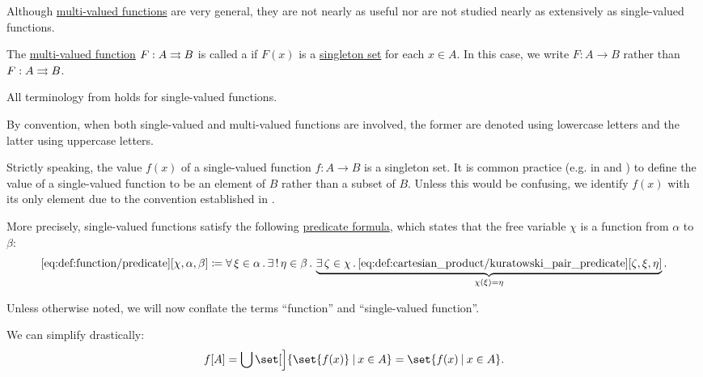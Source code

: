 \begin{definition}\label{def:function}
  Although \hyperref[def:multi_valued_function]{multi-valued functions} are very general, they are not nearly as useful nor are not studied nearly as extensively as single-valued functions.

  The \hyperref[def:multi_valued_function]{multi-valued function} \( F: A \rightrightarrows B \) is called a  if \( F(x) \) is a \hyperref[rem:singleton_sets]{singleton set} for each \( x \in A \). In this case, we write \( F: A \to B \) rather than \( F: A \rightrightarrows B \).

  All terminology from  holds for single-valued functions.

  By convention, when both single-valued and multi-valued functions are involved, the former are denoted using lowercase letters and the latter using uppercase letters.

  Strictly speaking, the value \( f(x) \) of a single-valued function \( f: A \to B \) is a singleton set. It is common practice (e.g. in \cite[def. 3.1]{OpenLogicFull} and \cite[10]{Kelley1955}) to define the value of a single-valued function to be an element of \( B \) rather than a subset of \( B \). Unless this would be confusing, we identify \( f(x) \) with its only element due to the convention established in .

  More precisely, single-valued functions satisfy the following \hyperref[rem:predicate_formula]{predicate formula}, which states that the free variable \( \chi \) is a function from \( \alpha \) to \( \beta \):
  \begin{equation*}\taglabel[\op{IsFun}]{eq:def:function/predicate}
    \ref{eq:def:function/predicate}[\chi, \alpha, \beta] \coloneqq \qforall {\xi \in \alpha} \qExists {\eta \in \beta} \underbrace{ \qexists {\zeta \in \chi} \ref{eq:def:cartesian_product/kuratowski_pair_predicate}[\zeta, \xi, \eta] }_{\chi(\xi) = \eta}.
  \end{equation*}

  Unless otherwise noted, we will now conflate the terms \enquote{function} and \enquote{single-valued function}.

  \begin{thmenum}
     We can simplify  drastically:
    \begin{equation*}
      f[A]
      =
      \bigcup \set[\Big]{ \set{ f(x) } \given x \in A }
      =
      \set{ f(x) \given x \in A }.
    \end{equation*}


\end{thmenum}
\end{definition}
